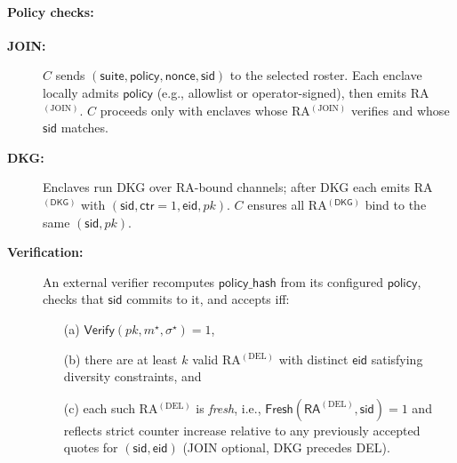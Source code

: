 \documentclass[runningheads,orivec]{llncs}
\begin{document}
\paragraph{Policy checks:}
\begin{description}
\item[\textbf{JOIN:}] $C$ sends $(\mathsf{suite},\mathsf{policy},\mathsf{nonce},\mathsf{sid})$ to the selected roster. Each enclave locally admits $\mathsf{policy}$ (e.g., allowlist or operator-signed), then emits RA$^{(\mathrm{JOIN})}$.
  $C$ proceeds only with enclaves whose RA$^{(\mathrm{JOIN})}$ verifies and whose $\mathsf{sid}$ matches.
  \item[\textbf{DKG:}] Enclaves run DKG over RA-bound channels; after DKG each emits RA$^{(\mathsf{DKG})}$ with $(\mathsf{sid},\mathsf{ctr}{=}1,\mathsf{eid},pk)$.
  $C$ ensures all RA$^{(\mathsf{DKG})}$ bind to the same $(\mathsf{sid},pk)$.
  \item[\textbf{Verification:}] An external verifier recomputes $\mathsf{policy\_hash}$ from its configured $\mathsf{policy}$,
  checks that $\mathsf{sid}$ commits to it, and accepts iff:
  \begin{enumerate}
    \item[(a)] $\mathsf{Verify}(pk,m^{\star},\sigma^{\star})=1$,
    \item[(b)] there are at least $k$ valid RA$^{(\mathrm{DEL})}$ with distinct $\mathsf{eid}$ satisfying diversity constraints, and
    \item[(c)] each such RA$^{(\mathrm{DEL})}$ is \emph{fresh}, i.e., $\textsf{Fresh}(\mathsf{RA}^{(\mathrm{DEL})},\mathsf{sid}){=}1$ and reflects strict counter increase relative to any previously accepted quotes for $(\mathsf{sid},\mathsf{eid})$ (JOIN optional, DKG precedes DEL).
  \end{enumerate}
\end{description}
\end{document}
